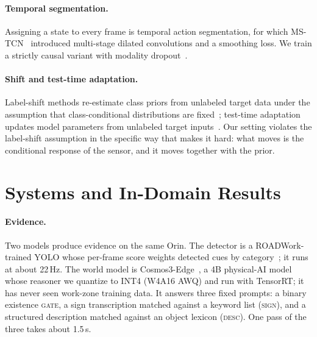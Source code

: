 \documentclass[conference]{IEEEtran}
\newcommand{\st}[1]{\textsc{#1}}
\begin{document}
\paragraph{Temporal segmentation.} Assigning a state to every frame is temporal action segmentation, for which MS-TCN~\cite{farha2019mstcn} introduced multi-stage dilated convolutions and a smoothing loss. We train a strictly causal variant with modality dropout~\cite{neverova2016moddrop}.

\paragraph{Shift and test-time adaptation.} Label-shift methods re-estimate class priors from unlabeled target data under the assumption that class-conditional distributions are fixed~\cite{saerens2002adjusting,lipton2018bbse}; test-time adaptation updates model parameters from unlabeled target inputs~\cite{wang2021tent}. Our setting violates the label-shift assumption in the specific way that makes it hard: what moves is the conditional response of the sensor, and it moves together with the prior.

\section{Systems and In-Domain Results}
\label{sec:systems}

\paragraph{Evidence.} Two models produce evidence on the same Orin. The detector is a ROADWork-trained YOLO whose per-frame score weights detected cues by category~\cite{priorsystem2026}; it runs at about 22\,Hz. The world model is Cosmos3-Edge~\cite{nvidia2026cosmos3}, a 4B physical-AI model whose reasoner we quantize to INT4 (W4A16 AWQ) and run with TensorRT; it has never seen work-zone training data. It answers three fixed prompts: a binary existence \st{gate}, a sign transcription matched against a keyword list (\st{sign}), and a structured description matched against an object lexicon (\st{desc}). One pass of the three takes about 1.5\,s.
\end{document}
